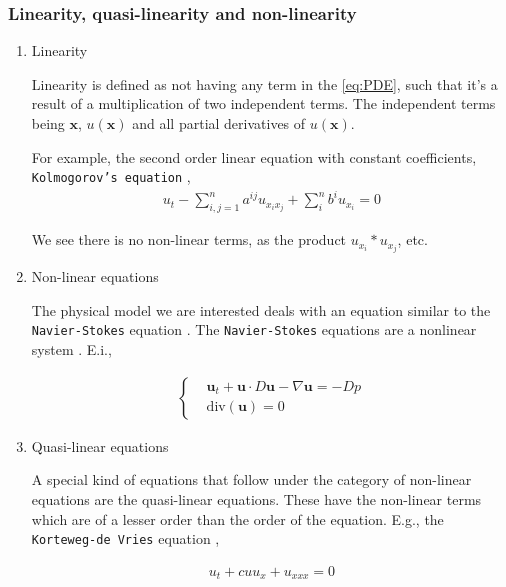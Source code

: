 \documentclass[11pt]{article}
\begin{document}
\subsubsection{Linearity, quasi-linearity and non-linearity}
\label{sec:orgaa23f18}
\begin{enumerate}
\item Linearity
\label{sec:org1dda5ae}

Linearity is defined as not having any term in the \eqref{eq:PDE}, such that it's
a result of a multiplication of two independent terms. The independent terms
being \(\mathbf{x}\), \(u(\mathbf{x})\) and all partial derivatives of
\(u(\mathbf{x})\).

For example, the second order linear equation with constant
coefficients, \texttt{Kolmogorov's equation} \cite{evans1998partial},
\begin{equation}
\begin{aligned}
u_{t} - \sum_{i,j=1}^{n}{a^{ij}u_{x_{i}x_{j}}} + \sum_{i}^{n}{b^{i}u_{x_{i}}} = 0
\end{aligned}
\end{equation}

We see there is no non-linear terms, as the product \(u_{x_{i}}*u_{x_{j}}\), etc.

\item Non-linear equations
\label{sec:org6e5e11a}
\label{sec:non-linear}

The physical model we are interested deals with an equation similar to the
\texttt{Navier-Stokes} equation \cite{kerner1993}. The \texttt{Navier-Stokes} equations are a
nonlinear system \cite{john1978partial} \cite{kerner1993}.
E.i.,

\begin{equation}
\label{eq:NavEstEQ}
\begin{aligned}
\begin{cases}
&\mathbf{u}_t + \mathbf{u} \cdot{} D\mathbf{u} - \nabla \mathbf{u} = - Dp \\
&\text{div}(\mathbf{u}) = 0
\end{cases}
\end{aligned}
\end{equation}

\item Quasi-linear equations
\label{sec:org898f047}

A special kind of equations that follow under the category of non-linear
equations are the quasi-linear equations. These have the non-linear terms which
are of a lesser order than the order of the equation. E.g., the \texttt{Korteweg-de
Vries} equation \cite{john1978partial},

\begin{equation}
\begin{aligned}
u_t + c uu_{x} + u_{xxx} = 0
\end{aligned}
\end{equation}
\end{enumerate}
\end{document}
